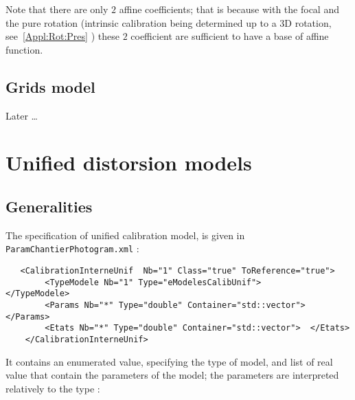 Note that there are only $2$ affine coefficients; that is because with 
the focal and the pure rotation (intrinsic calibration being determined up to
a 3D rotation, see~\ref{Appl:Rot:Pres} ) these $2$ coefficient are sufficient to have a
base of affine function.



\subsection{Grids model}

Later \dots




\section{Unified distorsion models}


\subsection{Generalities}

The specification of  unified calibration model, is given in 
{\tt ParamChantierPhotogram.xml} :

\begin{verbatim}
   <CalibrationInterneUnif  Nb="1" Class="true" ToReference="true">
        <TypeModele Nb="1" Type="eModelesCalibUnif">          </TypeModele>
        <Params Nb="*" Type="double" Container="std::vector"> </Params>
        <Etats Nb="*" Type="double" Container="std::vector">  </Etats>
    </CalibrationInterneUnif>
\end{verbatim}

It contains an enumerated value, specifying the type of model, and
list of real value that contain the parameters of the model; the parameters
are interpreted relatively to the type :


